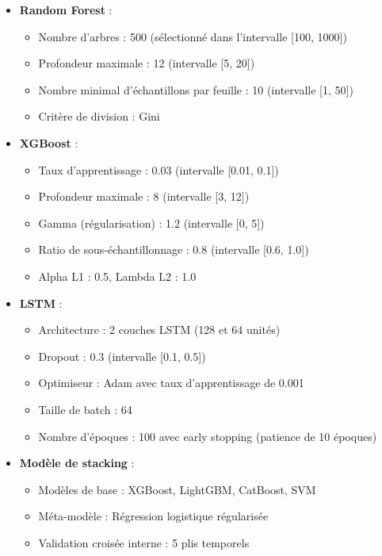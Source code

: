 \begin{itemize}
  \item \textbf{Random Forest} :
  \begin{itemize}
    \item Nombre d'arbres : 500 (sélectionné dans l'intervalle [100, 1000])
    \item Profondeur maximale : 12 (intervalle [5, 20])
    \item Nombre minimal d'échantillons par feuille : 10 (intervalle [1, 50])
    \item Critère de division : Gini
  \end{itemize}

  \item \textbf{XGBoost} :
  \begin{itemize}
    \item Taux d'apprentissage : 0.03 (intervalle [0.01, 0.1])
    \item Profondeur maximale : 8 (intervalle [3, 12])
    \item Gamma (régularisation) : 1.2 (intervalle [0, 5])
    \item Ratio de sous-échantillonnage : 0.8 (intervalle [0.6, 1.0])
    \item Alpha L1 : 0.5, Lambda L2 : 1.0
  \end{itemize}

  \item \textbf{LSTM} :
  \begin{itemize}
    \item Architecture : 2 couches LSTM (128 et 64 unités)
    \item Dropout : 0.3 (intervalle [0.1, 0.5])
    \item Optimiseur : Adam avec taux d'apprentissage de 0.001
    \item Taille de batch : 64
    \item Nombre d'époques : 100 avec early stopping (patience de 10 époques)
  \end{itemize}

  \item \textbf{Modèle de stacking} :
  \begin{itemize}
    \item Modèles de base : XGBoost, LightGBM, CatBoost, SVM
    \item Méta-modèle : Régression logistique régularisée
    \item Validation croisée interne : 5 plis temporels
  \end{itemize}
\end{itemize}

